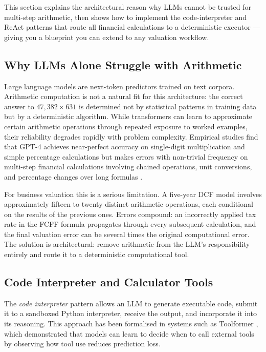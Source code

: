 \begin{deepdive}
This section explains the architectural reason why LLMs cannot be trusted for
multi-step arithmetic, then shows how to implement the code-interpreter and ReAct
patterns that route all financial calculations to a deterministic executor —
giving you a blueprint you can extend to any valuation workflow.

\subsection{Why LLMs Alone Struggle with Arithmetic}
\label{subsec:bv-tools-limitations}

Large language models are next-token predictors trained on text corpora. Arithmetic
computation is not a natural fit for this architecture: the correct answer to
$47{,}382 \times 631$ is determined not by statistical patterns in training data but
by a deterministic algorithm. While transformers can learn to approximate certain
arithmetic operations through repeated exposure to worked examples, their reliability
degrades rapidly with problem complexity. Empirical studies find that GPT-4 achieves
near-perfect accuracy on single-digit multiplication and simple percentage calculations
but makes errors with non-trivial frequency on multi-step financial calculations
involving chained operations, unit conversions, and percentage changes over long
formulas \cite{frieder2023mathematical}.

For business valuation this is a serious limitation. A five-year DCF model involves
approximately fifteen to twenty distinct arithmetic operations, each conditional on
the results of the previous ones. Errors compound: an incorrectly applied tax rate in
the FCFF formula propagates through every subsequent calculation, and the final
valuation error can be several times the original computational error. The solution
is architectural: remove arithmetic from the LLM's responsibility entirely and route
it to a deterministic computational tool.

\subsection{Code Interpreter and Calculator Tools}
\label{subsec:bv-tools-code-interpreter}

The \emph{code interpreter} pattern allows an LLM to generate executable code,
submit it to a sandboxed Python interpreter, receive the output, and incorporate
it into its reasoning. This approach has been formalised in systems such as
Toolformer \citep{schick2023toolformer}, which demonstrated that models can
learn to decide when to call external tools by observing how tool use reduces
prediction loss.


\end{deepdive}
